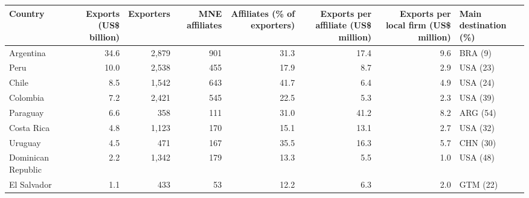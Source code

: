 \begin{tabular}{lrrrrrrl}
\toprule
Country & Exports (US\$ billion) & Exporters & MNE affiliates & Affiliates (\% of exporters) & Exports per affiliate (US\$ million) & Exports per local firm (US\$ million) & Main destination (\%) \\
\midrule
Argentina & 34.6 & 2,879 & 901 & 31.3 & 17.4 & 9.6 & BRA (9) \\
Peru & 10.0 & 2,538 & 455 & 17.9 & 8.7 & 2.9 & USA (23) \\
Chile & 8.5 & 1,542 & 643 & 41.7 & 6.4 & 4.9 & USA (24) \\
Colombia & 7.2 & 2,421 & 545 & 22.5 & 5.3 & 2.3 & USA (39) \\
Paraguay & 6.6 & 358 & 111 & 31.0 & 41.2 & 8.2 & ARG (54) \\
Costa Rica & 4.8 & 1,123 & 170 & 15.1 & 13.1 & 2.7 & USA (32) \\
Uruguay & 4.5 & 471 & 167 & 35.5 & 16.3 & 5.7 & CHN (30) \\
Dominican Republic & 2.2 & 1,342 & 179 & 13.3 & 5.5 & 1.0 & USA (48) \\
El Salvador & 1.1 & 433 & 53 & 12.2 & 6.3 & 2.0 & GTM (22) \\
\bottomrule
\end{tabular}
